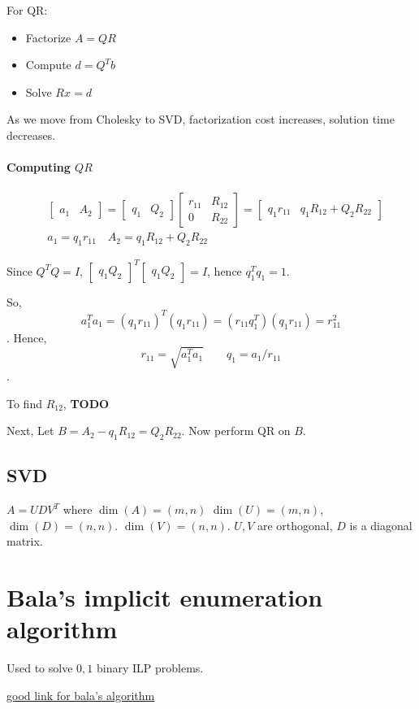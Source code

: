 \documentclass[11pt]{book}
\DeclareMathOperator{\shape}{dim}
\begin{document}
For QR:
\begin{itemize}
    \item Factorize $A = QR$
    \item Compute $d = Q^Tb$
    \item Solve $Rx = d$
\end{itemize}


As we move from Cholesky to SVD, factorization cost increases, solution
time decreases.

\paragraph{Computing $QR$}
\begin{align*}
    &\begin{bmatrix}
        a_1 & A_2
    \end{bmatrix} = 
    \begin{bmatrix}
        q_1 & Q_2
    \end{bmatrix} 
    \begin{bmatrix}
        r_{11} & R_{12} \\ 0 & R_{22}
    \end{bmatrix} =  
    \begin{bmatrix}
        q_1 r_{11}  & q_1 R_{12} + Q_2 R_{22}
    \end{bmatrix} 
    \\
    &a_1 = q_1 r_{11} \quad A_2 = q_1 R_{12} + Q_2 R_{22}
\end{align*}

Since $Q^TQ = I$, $\begin{bmatrix}q_1 Q_2\end{bmatrix}^T \begin{bmatrix} q_1 Q_2\end{bmatrix} = I$,
hence $q_1^T q_1 = 1$.

So, \[a_1^Ta_1 = (q_1 r_{11})^T (q_1 r_{11}) = (r_{11} q_1^T) (q_1 r_{11}) = r_{11}^2\].
Hence, \[r_{11} = \sqrt{a_1^T a_1} \qquad q_1 = a_1 / r_{11}\].

To find $R_{12}$, \textbf{TODO}

Next, Let $B = A_2 - q_1 R_{12} = Q_2 R_{22}$. Now perform QR on $B$.

\subsection{SVD}
$A = UDV^T$ where $\shape(A) = (m, n)$ $\shape(U) = (m, n)$, $\shape(D) =  (n, n)$.
$\dim(V) = (n, n)$.  $U, V$ are orthogonal, $D$ is a diagonal matrix.

\section{Bala's implicit enumeration algorithm}
Used to solve $0, 1$ binary ILP problems.

\href{https://www.sce.carleton.ca/faculty/chinneck/po/Chapter13.pdf}{good link for bala's algorithm}
\end{document}
